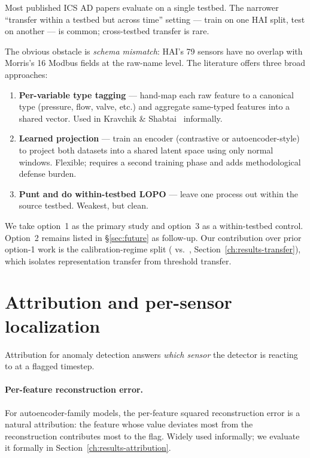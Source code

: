 Most published ICS AD papers evaluate on a single testbed.  The narrower ``transfer within a testbed but across time'' setting --- train on one HAI split, test on another --- is common; cross-testbed transfer is rare.

The obvious obstacle is \emph{schema mismatch}: HAI's 79 sensors have no overlap with Morris's 16 Modbus fields at the raw-name level.  The literature offers three broad approaches:

\begin{enumerate}
  \item \textbf{Per-variable type tagging} --- hand-map each raw feature to a canonical type (pressure, flow, valve, etc.) and aggregate same-typed features into a shared vector.  Used in Kravchik \& Shabtai~\cite{kravchik2018detecting} informally.
  \item \textbf{Learned projection} --- train an encoder (contrastive or autoencoder-style) to project both datasets into a shared latent space using only normal windows.  Flexible; requires a second training phase and adds methodological defense burden.
  \item \textbf{Punt and do within-testbed LOPO} --- leave one process out within the source testbed.  Weakest, but clean.
\end{enumerate}

We take option~1 as the primary study and option~3 as a within-testbed control.  Option~2 remains listed in \S\ref{sec:future} as follow-up.  Our contribution over prior option-1 work is the calibration-regime split ( vs.\ , Section~\ref{ch:results-transfer}), which isolates representation transfer from threshold transfer.

\section{Attribution and per-sensor localization}

Attribution for anomaly detection answers \emph{which sensor} the detector is reacting to at a flagged timestep.

\paragraph{Per-feature reconstruction error.}  For autoencoder-family models, the per-feature squared reconstruction error is a natural attribution: the feature whose value deviates most from the reconstruction contributes most to the flag.  Widely used informally; we evaluate it formally in Section~\ref{ch:results-attribution}.

